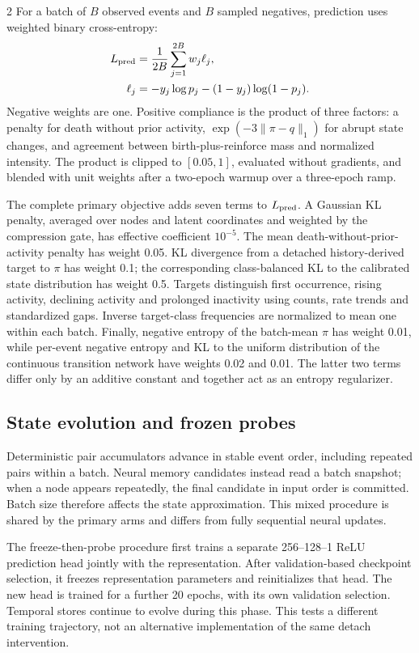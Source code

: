 \documentclass[a4paper,10pt,fleqn]{article}
\begin{document}
\begin{multicols}{2}
For a batch of $B$ observed events and $B$ sampled negatives, prediction uses weighted binary cross-entropy:
\begin{align}
L_{\rm pred}&=\frac{1}{2B}\sum_{j=1}^{2B}w_j\ell_j,\nonumber\\
\ell_j&=-y_j\log p_j-(1-y_j)\log(1-p_j).
\label{eq:bce}
\end{align}
Negative weights are one. Positive compliance is the product of three factors: a penalty for death without prior activity, $\exp(-3\|\pi-q\|_1)$ for abrupt state changes, and agreement between birth-plus-reinforce mass and normalized intensity. The product is clipped to $[0.05,1]$, evaluated without gradients, and blended with unit weights after a two-epoch warmup over a three-epoch ramp.

The complete primary objective adds seven terms to $L_{\rm pred}$. A Gaussian KL penalty, averaged over nodes and latent coordinates and weighted by the compression gate, has effective coefficient $10^{-5}$. The mean death-without-prior-activity penalty has weight 0.05. KL divergence from a detached history-derived target to $\pi$ has weight 0.1; the corresponding class-balanced KL to the calibrated state distribution has weight 0.5. Targets distinguish first occurrence, rising activity, declining activity and prolonged inactivity using counts, rate trends and standardized gaps. Inverse target-class frequencies are normalized to mean one within each batch. Finally, negative entropy of the batch-mean $\pi$ has weight 0.01, while per-event negative entropy and KL to the uniform distribution of the continuous transition network have weights 0.02 and 0.01. The latter two terms differ only by an additive constant and together act as an entropy regularizer.

\subsection{State evolution and frozen probes}
Deterministic pair accumulators advance in stable event order, including repeated pairs within a batch. Neural memory candidates instead read a batch snapshot; when a node appears repeatedly, the final candidate in input order is committed. Batch size therefore affects the state approximation. This mixed procedure is shared by the primary arms and differs from fully sequential neural updates.

The freeze-then-probe procedure first trains a separate 256--128--1 ReLU prediction head jointly with the representation. After validation-based checkpoint selection, it freezes representation parameters and reinitializes that head. The new head is trained for a further 20 epochs, with its own validation selection. Temporal stores continue to evolve during this phase. This tests a different training trajectory, not an alternative implementation of the same detach intervention.


\end{multicols}
\end{document}
